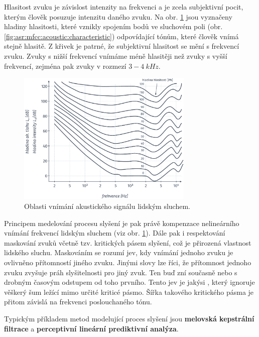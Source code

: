 Hlasitost zvuku je závislost intenzity na frekvenci a je zcela subjektivní pocit, kterým člověk posuzuje intenzitu daného zvuku. Na obr. \ref{fig:asr:mfcc:acoustic:levels} jsou vyznačeny hladiny hlasitosti, které vznikly spojením bodů ve sluchovém poli (obr. \ref{fig:asr:mfcc:acoustic:characteristic}) odpovídající tónům, které člověk vnímá stejně hlasitě. Z křivek je patrné, že subjektivní hlasitost se mění s frekvencí zvuku. Zvuky s nižší frekvencí vnímáme méně hlasitěji než zvuky s vyšší frekvencí, zejména pak zvuky v rozmezí $3 - 4\ kHz$. \cite{Psutka2006}

\begin{figure}[hbpt]
  \centering
  \includegraphics[width=0.75\textwidth]{./ch4-asr/img/listening_levels.pdf}
  \caption{Oblasti vnímání akustického signálu lidským sluchem.}
  \label{fig:asr:mfcc:acoustic:levels}
\end{figure}

Principem medelování procesu slyšení je pak právě kompenzace nelineárního vnímání frekvencí lidským sluchem (viz obr. \ref{fig:asr:mfcc:acoustic:levels}). Dále pak i respektování maskování zvuků včetně tzv. kritických pásem slyšení, což je přirozená vlastnost lidského sluchu. Maskováním se rozumí jev, kdy vnímání jednoho zvuku je ovlivněno přítomností jiného zvuku. Jinými slovy lze říci, že přítomnost jednoho zvuku zvyšuje práh slyšitelnosti pro jiný zvuk. Ten buď zní současně nebo s drobným časovým odstupem od toho prvního. Tento jev je jakýsi , který ignoruje věškerý šum ležící mimo určité kriticé pásmo. Šířka takového kritického pásma je přitom závislá na frekvenci poslouchaného tónu.

Typickým příkladem metod modelující proces slyšení jsou \textbf{melovská kepstrální filtrace} a \textbf{perceptivní lineární prediktivní analýza}.

